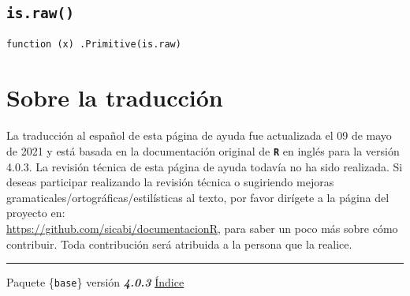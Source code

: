 \documentclass{article}[letter, 12pt]
\newlength\tindent
\renewcommand{\indent}{\hspace*{\tindent}}
\def\code#1{\texttt{#1}}
\def\codename#1{\textbf{\texttt{\color{gray}#1}}}
\begin{document}
\subsection{\color{gray}\code{is.raw()}}
\indent\code{function (x) .Primitive(\textquotedbl\code{is.raw}\textquotedbl)} \\

\section{\color{gray}Sobre la traducción}
\paragraph{}
La traducción al español de esta página de ayuda fue actualizada el 09 de mayo de 2021 y está basada en la documentación original de \codename{R} en inglés para la versión 4.0.3. La revisión técnica de esta página de ayuda todavía no ha sido realizada. Si deseas participar realizando la revisión técnica o sugiriendo mejoras gramaticales/ortográficas/estilísticas al texto, por favor dirígete a la página del proyecto en: \\\href{https://github.com/sicabi/documentacionR}{https://github.com/sicabi/documentacionR}, para saber un poco más sobre cómo contribuir. Toda contribución será atribuida a la persona que la realice.
\\
\par\noindent\rule{\textwidth}{0.4pt}
\centerline{Paquete \{\code{base}\} versión \textbf{\emph{4.0.3}} \href{run:/Vocabulary.pdf}{Índice}}
\end{document}
